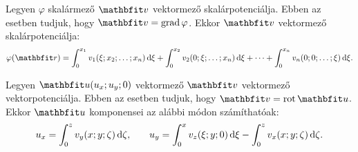 \documentclass[fleqn]{szb-practice}
\begin{document}
\begin{blueBox}
  Legyen $\varphi$ skalármező $\rvec v$ vektormező skalárpotenciálja. Ebben
  az esetben tudjuk, hogy $\rvec v = \grad \varphi$. Ekkor $\rvec v$
  vektormező skalárpotenciálja:
  $$
    \varphi(\coordvec)
    = \int_0^{x_1} v_1(\xi; x_2; \dots; x_n) \dd \xi
    + \int_0^{x_2} v_2(0; \xi; \dots; x_n) \dd \xi
    + \dots
    + \int_0^{x_n} v_n(0; 0; \dots; \xi) \dd \xi
    \text.
  $$
\end{blueBox}

\begin{blueBox}
  Legyen $\rvec u(u_x; u_y; 0)$ vektormező $\rvec v$ vektormező
  vektorpotenciálja. Ebben az esetben tudjuk, hogy $\rvec v = \rot \rvec u$.
  Ekkor $\rvec u$ komponensei az alábbi módon számíthatóak:
  $$
    u_x = \int_0^z v_y(x; y; \zeta) \mathop{}\!\mathrm{d} \zeta
    \text,
    \qquad
    u_y = \int_0^x v_z(\xi; y; 0) \mathop{}\!\mathrm{d} \xi
    - \int_0^z v_x(x; y; \zeta) \mathop{}\!\mathrm{d} \zeta
    \text.
  $$
\end{blueBox}
\end{document}
